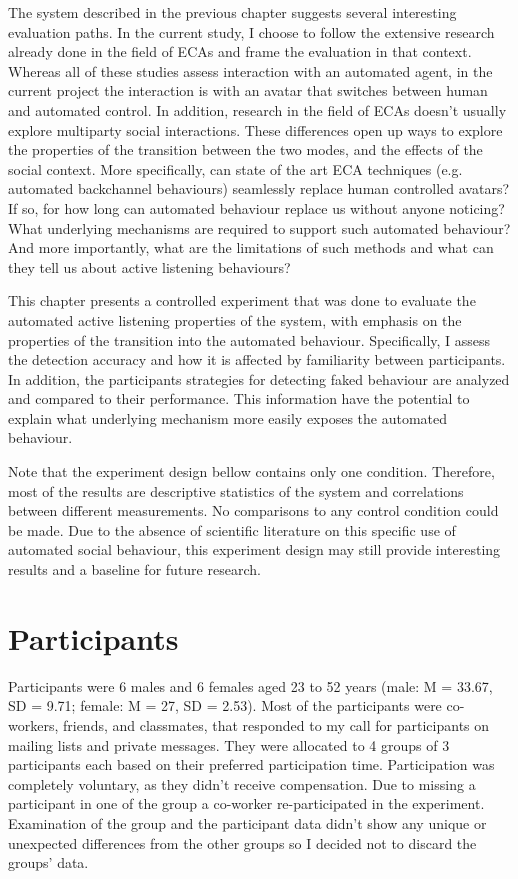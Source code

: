 \documentclass[]{simple-thesis}
\begin{document}
The system described in the previous chapter suggests several interesting evaluation paths.
In the current study, I choose to follow the extensive research already done in the field of ECAs \citep{Nishimura2007, Bevacqua2008, Gratch2007, Huang2011, Lee2006, Poppe2013} and frame the evaluation in that context.
Whereas all of these studies assess interaction with an automated agent, in the current project the interaction is with an avatar that switches between human and automated control.
In addition, research in the field of ECAs doesn't usually explore multiparty social interactions.
These differences open up ways to explore the properties of the transition between the two modes, and the effects of the social context.
More specifically, can state of the art ECA techniques (e.g. automated backchannel behaviours) seamlessly replace human controlled avatars?
If so, for how long can automated behaviour replace us without anyone noticing?
What underlying mechanisms are required to support such automated behaviour?
And more importantly, what are the limitations of such methods and what can they tell us about active listening behaviours?

This chapter presents a controlled experiment that was done to evaluate the automated active listening properties of the system, with emphasis on the properties of the transition into the automated behaviour.
Specifically, I assess the detection accuracy and how it is affected by familiarity between participants.
In addition, the participants strategies for detecting faked behaviour are analyzed and compared to their performance.
This information have the potential to explain what underlying mechanism more easily exposes the automated behaviour.

Note that the experiment design bellow contains only one condition.
Therefore, most of the results are descriptive statistics of the system and correlations between different measurements.
No comparisons to any control condition could be made.
Due to the absence of scientific literature on this specific use of automated social behaviour, this experiment design may still provide interesting results and a baseline for future research.

\section{Participants}

Participants were 6 males and 6 females aged 23 to 52 years (male: M = 33.67, SD = 9.71; female: M = 27, SD = 2.53).
Most of the participants were co-workers, friends, and classmates, that responded to my call for participants on mailing lists and private messages.
They were allocated to 4 groups of 3 participants each based on their preferred participation time.
Participation was completely voluntary, as they didn't receive compensation.
Due to missing a participant in one of the group a co-worker re-participated in the experiment.
Examination of the group and the participant data didn't show any unique or unexpected differences from the other groups so I decided not to discard the groups' data.
\end{document}
